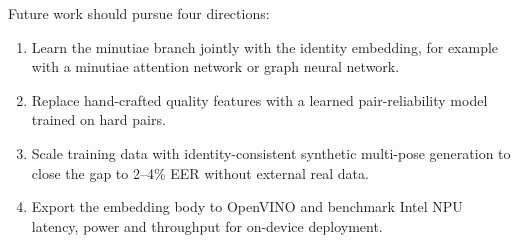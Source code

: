 \documentclass[12pt,a4paper]{article}
\begin{document}
Future work should pursue four directions:
\begin{enumerate}[leftmargin=*]
    \item Learn the minutiae branch jointly with the identity embedding, for example with a minutiae attention network or graph neural network.
    \item Replace hand-crafted quality features with a learned pair-reliability model trained on hard pairs.
    \item Scale training data with identity-consistent synthetic multi-pose generation to close the gap to 2--4\% EER without external real data.
    \item Export the embedding body to OpenVINO and benchmark Intel NPU latency, power and throughput for on-device deployment.
\end{enumerate}

\end{document}
